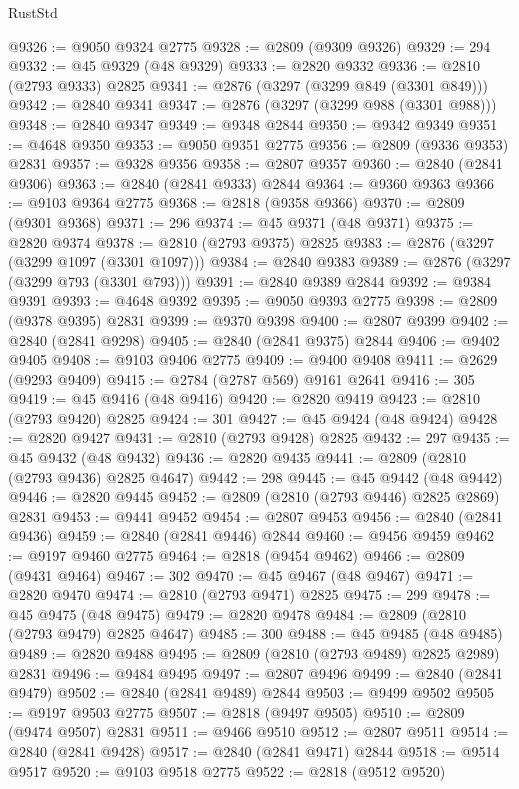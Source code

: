 \begin{lexlean}{RustStd}
\begin{coremodule}
@9326 := @9050 @9324 @2775
@9328 := @2809 (@9309 @9326)
@9329 := 294
@9332 := @45 @9329 (@48 @9329)
@9333 := @2820 @9332
@9336 := @2810 (@2793 @9333) @2825
@9341 := @2876 (@3297 (@3299 @849 (@3301 @849)))
@9342 := @2840 @9341
@9347 := @2876 (@3297 (@3299 @988 (@3301 @988)))
@9348 := @2840 @9347
@9349 := @9348 @2844
@9350 := @9342 @9349
@9351 := @4648 @9350
@9353 := @9050 @9351 @2775
@9356 := @2809 (@9336 @9353) @2831
@9357 := @9328 @9356
@9358 := @2807 @9357
@9360 := @2840 (@2841 @9306)
@9363 := @2840 (@2841 @9333) @2844
@9364 := @9360 @9363
@9366 := @9103 @9364 @2775
@9368 := @2818 (@9358 @9366)
@9370 := @2809 (@9301 @9368)
@9371 := 296
@9374 := @45 @9371 (@48 @9371)
@9375 := @2820 @9374
@9378 := @2810 (@2793 @9375) @2825
@9383 := @2876 (@3297 (@3299 @1097 (@3301 @1097)))
@9384 := @2840 @9383
@9389 := @2876 (@3297 (@3299 @793 (@3301 @793)))
@9391 := @2840 @9389 @2844
@9392 := @9384 @9391
@9393 := @4648 @9392
@9395 := @9050 @9393 @2775
@9398 := @2809 (@9378 @9395) @2831
@9399 := @9370 @9398
@9400 := @2807 @9399
@9402 := @2840 (@2841 @9298)
@9405 := @2840 (@2841 @9375) @2844
@9406 := @9402 @9405
@9408 := @9103 @9406 @2775
@9409 := @9400 @9408
@9411 := @2629 (@9293 @9409)
@9415 := @2784 (@2787 @569) @9161 @2641
@9416 := 305
@9419 := @45 @9416 (@48 @9416)
@9420 := @2820 @9419
@9423 := @2810 (@2793 @9420) @2825
@9424 := 301
@9427 := @45 @9424 (@48 @9424)
@9428 := @2820 @9427
@9431 := @2810 (@2793 @9428) @2825
@9432 := 297
@9435 := @45 @9432 (@48 @9432)
@9436 := @2820 @9435
@9441 := @2809 (@2810 (@2793 @9436) @2825 @4647)
@9442 := 298
@9445 := @45 @9442 (@48 @9442)
@9446 := @2820 @9445
@9452 := @2809 (@2810 (@2793 @9446) @2825 @2869) @2831
@9453 := @9441 @9452
@9454 := @2807 @9453
@9456 := @2840 (@2841 @9436)
@9459 := @2840 (@2841 @9446) @2844
@9460 := @9456 @9459
@9462 := @9197 @9460 @2775
@9464 := @2818 (@9454 @9462)
@9466 := @2809 (@9431 @9464)
@9467 := 302
@9470 := @45 @9467 (@48 @9467)
@9471 := @2820 @9470
@9474 := @2810 (@2793 @9471) @2825
@9475 := 299
@9478 := @45 @9475 (@48 @9475)
@9479 := @2820 @9478
@9484 := @2809 (@2810 (@2793 @9479) @2825 @4647)
@9485 := 300
@9488 := @45 @9485 (@48 @9485)
@9489 := @2820 @9488
@9495 := @2809 (@2810 (@2793 @9489) @2825 @2989) @2831
@9496 := @9484 @9495
@9497 := @2807 @9496
@9499 := @2840 (@2841 @9479)
@9502 := @2840 (@2841 @9489) @2844
@9503 := @9499 @9502
@9505 := @9197 @9503 @2775
@9507 := @2818 (@9497 @9505)
@9510 := @2809 (@9474 @9507) @2831
@9511 := @9466 @9510
@9512 := @2807 @9511
@9514 := @2840 (@2841 @9428)
@9517 := @2840 (@2841 @9471) @2844
@9518 := @9514 @9517
@9520 := @9103 @9518 @2775
@9522 := @2818 (@9512 @9520)

\end{coremodule}
\end{lexlean}
